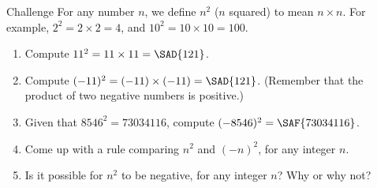 \documentclass[12pt,letterpaper]{article}
\begin{document}
\begin{problem}{Challenge}
 For any number \(n\), we define \(n^2\) (\(n\) squared) to mean \(n\times n\). For example,
 \(2^2=2\times2=4\), and \(10^2=10\times10=100\).

 \begin{enumerate}
   \item Compute \(11^2 = 11 \times 11 = \SAD{121}\).
   \item Compute \((-11)^2 = (-11) \times (-11) = \SAD{121}\). (Remember that the product of
   two negative numbers is positive.)
   \item Given that \(8546^2 = 73034116\), compute \((-8546)^2 = \SAF{73034116}\).
   \item Come up with a rule comparing \(n^2\) and \((-n)^2\), for any integer \(n\).
   \item Is it possible for \(n^2\) to be negative, for any integer \(n\)? Why or why not?
 \end{enumerate}
\end{problem}
\end{document}
